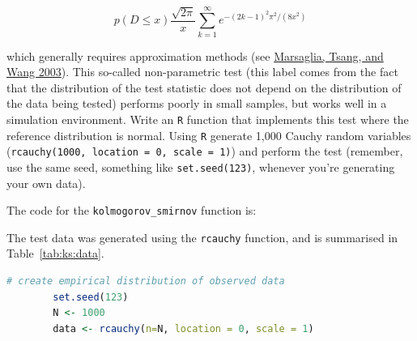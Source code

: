 \documentclass[12pt,letterpaper]{article}
\begin{document}
$$p(D \leq x) \frac{\sqrt {2\pi}}{x} \sum _{k=1}^{\infty }e^{-(2k-1)^{2}\pi ^{2}/(8x^{2})}$$


\noindent which generally requires approximation methods (see \href{https://core.ac.uk/download/pdf/25787785.pdf}{Marsaglia, Tsang, and Wang 2003}). This so-called non-parametric test (this label comes from the fact that the distribution of the test statistic does not depend on the distribution of the data being tested) performs poorly in small samples, but works well in a simulation environment. Write an \texttt{R} function that implements this test where the reference distribution is normal. Using \texttt{R} generate 1,000 Cauchy random variables (\texttt{rcauchy(1000, location = 0, scale = 1)}) and perform the test (remember, use the same seed, something like \texttt{set.seed(123)}, whenever you're generating your own data).\\

  The code for the \texttt{kolmogorov\_smirnov} function is:

  

  The test data was generated using the \texttt{rcauchy} function, and is  summarised in Table~\ref{tab:ks:data}.
	\begin{lstlisting}[language=R]
		# create empirical distribution of observed data
		set.seed(123)
		N <- 1000
		data <- rcauchy(n=N, location = 0, scale = 1)
	\end{lstlisting}
\end{document}
